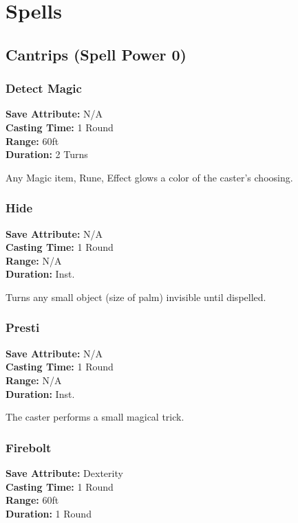 \section*{Spells}%
\begin{multicols}{2}
\subsection*{Cantrips (Spell Power 0)}
\subsubsection*{Detect Magic}
\begin{mercClassInfo}
\textbf{Save Attribute:} N/A\\
\textbf{Casting Time:} 1 Round\\
\textbf{Range:} 60ft\\
\textbf{Duration:} 2 Turns
\end{mercClassInfo}

Any Magic item, Rune, Effect glows a color of the caster's choosing.

\subsubsection*{Hide}
\begin{mercClassInfo}
\textbf{Save Attribute:} N/A\\
\textbf{Casting Time:} 1 Round\\
\textbf{Range:} N/A\\
\textbf{Duration:} Inst.
\end{mercClassInfo}
Turns any small object (size of palm) invisible until dispelled.

\subsubsection*{Presti}
\begin{mercClassInfo}
\textbf{Save Attribute:} N/A\\
\textbf{Casting Time:} 1 Round\\
\textbf{Range:} N/A\\
\textbf{Duration:} Inst.
\end{mercClassInfo}
The caster performs a small magical trick.

\subsubsection*{Firebolt}
\begin{mercClassInfo}
\textbf{Save Attribute:} Dexterity\\
\textbf{Casting Time:} 1 Round\\
\textbf{Range:} 60ft\\
\textbf{Duration:} 1 Round
\end{mercClassInfo}


\end{multicols}

